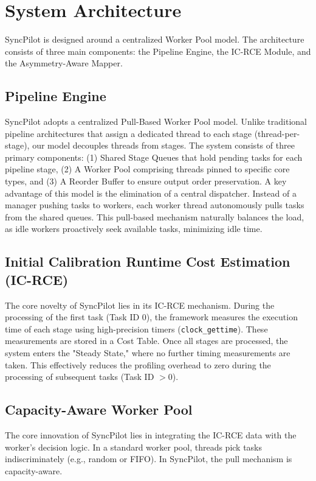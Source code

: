 \documentclass[runningheads]{llncs}
\begin{document}
\section{System Architecture}
SyncPilot is designed around a centralized Worker Pool model. The architecture consists of three main components: the Pipeline Engine, the IC-RCE Module, and the Asymmetry-Aware Mapper.

\subsection{Pipeline Engine}
SyncPilot adopts a centralized Pull-Based Worker Pool model. Unlike traditional pipeline architectures that assign a dedicated thread to each stage (thread-per-stage), our model decouples threads from stages. 
The system consists of three primary components: (1) Shared Stage Queues that hold pending tasks for each pipeline stage, (2) A Worker Pool comprising threads pinned to specific core types, and (3) A Reorder Buffer to ensure output order preservation.
A key advantage of this model is the elimination of a central dispatcher. Instead of a manager pushing tasks to workers, each worker thread autonomously pulls tasks from the shared queues. This pull-based mechanism naturally balances the load, as idle workers proactively seek available tasks, minimizing idle time.

\subsection{Initial Calibration Runtime Cost Estimation (IC-RCE)}
The core novelty of SyncPilot lies in its IC-RCE mechanism. During the processing of the first task (Task ID 0), the framework measures the execution time of each stage using high-precision timers (\texttt{clock\_gettime}). These measurements are stored in a Cost Table. Once all stages are processed, the system enters the "Steady State," where no further timing measurements are taken. This effectively reduces the profiling overhead to zero during the processing of subsequent tasks (Task ID $> 0$).

\subsection{Capacity-Aware Worker Pool}
The core innovation of SyncPilot lies in integrating the IC-RCE data with the worker's decision logic. In a standard worker pool, threads pick tasks indiscriminately (e.g., random or FIFO). In SyncPilot, the pull mechanism is capacity-aware.
\end{document}
